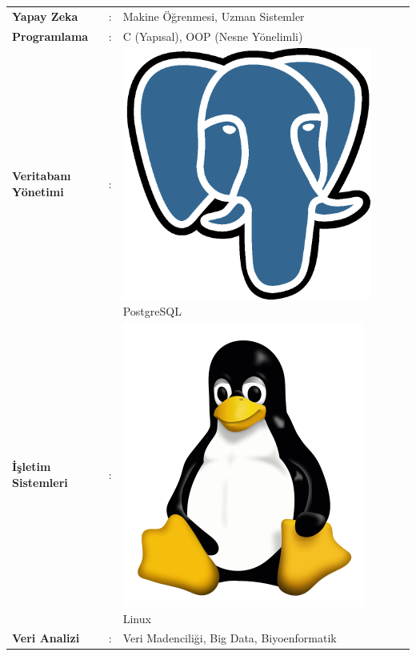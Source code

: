 \documentclass[paper=a4,fontsize=11pt]{temp} %
\begin{document}
\begin{minipage}[t]{0.66\textwidth}
\begin{tabular}{llllll}
\textbf{Yapay Zeka}          & : & Makine Öğrenmesi, Uzman Sistemler          &  &  &  \\
\textbf{Programlama}         & : & C (Yapısal), OOP (Nesne Yönelimli)         &  &  &  \\
\textbf{Veritabanı Yönetimi} & : & \includegraphics[scale=0.02]{IMG/tech/postgresql} PostgreSQL                                 &  &  &  \\
\textbf{İşletim Sistemleri}  & : & \includegraphics[scale=0.03]{IMG/tech/linux} Linux                                      &  &  &  \\
\textbf{Veri Analizi}        & : & Veri Madenciliği, Big Data, Biyoenformatik &  &  & 
\end{tabular}

\end{minipage}
\end{document}
